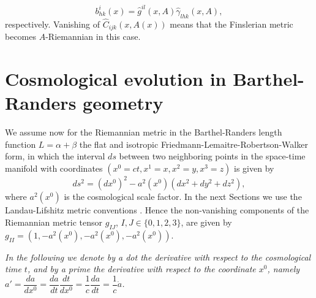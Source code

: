 \documentclass[aps,superscriptaddress, showpacs,preprintnumbers, superscriptaddress, nofootinbibt,twocolumn]{revtex4-2}
\begin{document}
\begin{equation}
b_{hk}^{i}(x)=\hat{g}^{il}\left( x,A\right) \hat{\gamma}_{lhk}\left( x,A\right)
,
\end{equation}%
respectively.
Vanishing of $\hat{C}_{ijk}(x,A(x))$ means that the
Finslerian metric becomes $A$-Riemannian in this case.

\section{Cosmological evolution in Barthel-Randers geometry}\label{sect3}

We assume now for the Riemannian metric in the Barthel-Randers length
function $L=\alpha +\beta $ the flat and isotropic
Friedmann-Lemaitre-Robertson-Walker form, in which the interval $ds$ between
two neighboring points in the space-time manifold with coordinates $\left(
x^{0}=ct,x^{1}=x,x^{2}=y,x^{3}=z\right) $ is given by
\begin{equation}  \label{metr}
ds^{2}=\left(dx^0\right)^{2}-a^{2}\left(x^0\right)\left( dx^{2}+dy^{2}+dz^{2}\right) ,
\end{equation}%
where  $a^{2}\left(x^0\right)$ is the cosmological scale
factor. In the next Sections we use the Landau-Lifshitz metric conventions \cite{Land}. Hence the non-vanishing components of the Riemannian metric tensor $g_{IJ}$, $I,J\in\{0,1,2,3\}$, are
given by $g_{II}=\left( 1,-a^{2}\left(x^0\right),-a^{2}\left(x^0\right),-a^{2}\left(x^0\right)\right) $.

{\it In the
following we denote by a dot the derivative with respect to the cosmological
time $t$, and by a prime the derivative with respect to the coordinate $%
x^{0} $, namely $a'=\dfrac{d a}{d x^0}=\dfrac{d a}{dt}\dfrac{dt}{d x^0}=\dfrac{1}{c}\dfrac{d a}{dt}=\dfrac{1}{c}\dot{a}$.
}
\end{document}
